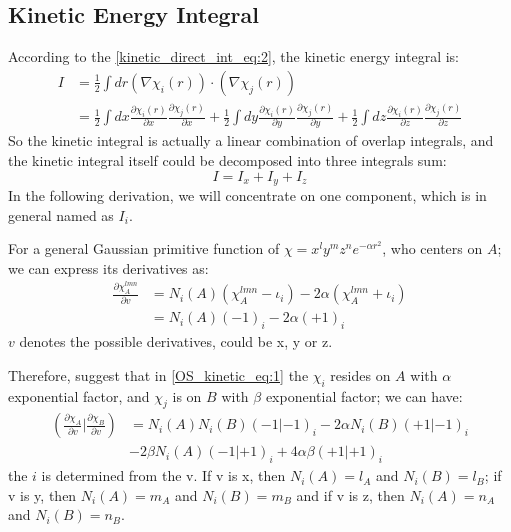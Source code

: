 \subsection{Kinetic Energy Integral}
%
%
%
According to the \ref{kinetic_direct_int_eq:2}, the kinetic energy integral is:
\begin{align}
 \label{OS_kinetic_eq:1}
I &= \frac{1}{2}\int dr (\nabla\chi_{i}(r)) \cdotp (\nabla\chi_{j}(r)) \nonumber \\
  &= \frac{1}{2}\int d x \frac{\partial \chi_{i}(r)}{\partial x}
  \frac{\partial \chi_{j}(r)}{\partial x} 
  +  \frac{1}{2}\int d y \frac{\partial \chi_{i}(r)}{\partial y}
  \frac{\partial \chi_{j}(r)}{\partial y} 
  +  \frac{1}{2}\int d z \frac{\partial \chi_{i}(r)}{\partial z}
  \frac{\partial \chi_{j}(r)}{\partial z} 
\end{align}
So the kinetic integral is actually a linear combination of overlap integrals,
and the kinetic integral itself could be decomposed into three integrals sum:
\begin{equation}
 I = I_{x} + I_{y} + I_{z}
\end{equation}
In the following derivation, we will concentrate on one component, which is 
in general named as $I_{i}$.

For a general Gaussian primitive function of $\chi = x^{l}y^{m}z^{n}e^{-\alpha r^{2}}$, who 
centers on $A$; we can express its derivatives as:
\begin{align}
 \frac{\partial \chi^{lmn}_{A}}{\partial v} &= 
 N_{i}(A)(\chi_{A}^{lmn}-\iota_{i}) - 2\alpha(\chi_{A}^{lmn}+\iota_{i}) \nonumber \\
 &= N_{i}(A)(-1)_{i} - 2\alpha(+1)_{i}
 \label{OS_kinetic_eq:0}
\end{align}
$v$ denotes the possible derivatives, could be x, y or z. 

Therefore, suggest that in \ref{OS_kinetic_eq:1} the $\chi_{i}$ resides 
on $A$ with $\alpha$ exponential factor, and $\chi_{j}$ is on $B$ with
$\beta$ exponential factor; we can have:
\begin{equation}
\begin{split}
\left(  \frac{\partial \chi_{A}}{\partial v}|\frac{\partial \chi_{B}}{\partial v}
\right)  &= N_{i}(A)N_{i}(B)(-1|-1)_{i} -2\alpha N_{i}(B)(+1|-1)_{i} \\
&-2\beta N_{i}(A)(-1|+1)_{i} + 4\alpha\beta(+1|+1)_{i}
\end{split}
\label{OS_kinetic_eq:2}
\end{equation}
the $i$ is determined from the v. If v is x, then $N_{i}(A) = l_{A}$ and 
$N_{i}(B) = l_{B}$; if v is y, then $N_{i}(A) = m_{A}$ and 
$N_{i}(B) = m_{B}$ and if v is z, then $N_{i}(A) = n_{A}$ and 
$N_{i}(B) = n_{B}$. 


